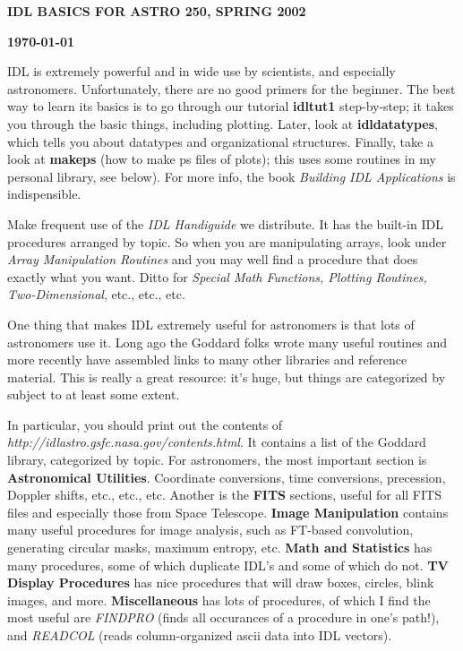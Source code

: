  

\centerline{\bf IDL BASICS FOR ASTRO 250, SPRING 2002}
\centerline{\bf \today}


	 IDL is extremely powerful and in wide use by scientists, and
especially astronomers.  Unfortunately, there are no good primers for
the beginner.  The best way to learn its basics is to go through our
tutorial {\bf idltut1} step-by-step; it takes you through the basic things,
including plotting.  Later, look at {\bf idldatatypes}, which tells you
about datatypes and organizational structures.  Finally, take a look at
{\bf makeps} (how to make ps files of plots); this uses some
routines in my personal library, see below).  For
more info, the book {\it Building IDL Applications} is indispensible. 


	Make frequent use of the {\it IDL Handiguide} we distribute.  It
has the built-in IDL procedures arranged by topic.  So when you are
manipulating arrays, look under {\it Array Manipulation Routines} and
you may well find a procedure that does exactly what you want.  Ditto
for {\it Special Math Functions, Plotting Routines, Two-Dimensional},
etc., etc., etc.  


	One thing that makes IDL extremely useful for astronomers is
that lots of astronomers use it.  Long ago the Goddard folks wrote many
useful routines and more recently have assembled links to many other
libraries and reference material.  This is really a great resource: it's
huge, but things are categorized by subject to at least some extent. 

	In particular, you should print out the contents of {\it
http://idlastro.gsfc.nasa.gov/contents.html}.  It contains a list of the
Goddard library, categorized by topic.  For astronomers, the most
important section is {\bf Astronomical Utilities}.  Coordinate
conversions, time conversions, precession, Doppler shifts, etc., etc.,
etc.  Another is the {\bf FITS} sections, useful for all FITS files and
especially those from Space Telescope.  {\bf Image Manipulation}
contains many useful procedures for image analysis, such as FT-based
convolution, generating circular masks, maximum entropy, etc.  {\bf Math
and Statistics} has many procedures, some of which duplicate IDL's and
some of which do not.  {\bf TV Display Procedures} has nice procedures
that will draw boxes, circles, blink images, and more.  {\bf
Miscellaneous} has lots of procedures, of which I find the most useful
are {\it FINDPRO} (finds all occurances of a procedure in one's path!),
and {\it READCOL} (reads column-organized ascii data into IDL vectors). 


